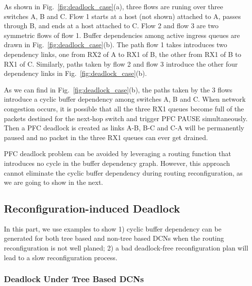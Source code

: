 As shown in Fig.~\ref{fig:deadlock_case}(a), three flows are runing over three switches A, B and C. Flow 1 starts at a host (not shown) attached to A, passes through B, and ends at a host attached to C. Flow 2 and flow 3 are two symmetric flows of flow 1. Buffer dependencies among active ingress queues are drawn in Fig.~\ref{fig:deadlock_case}(b). The path flow 1 takes introduces two dependency links, one from RX2 of A to RX1 of B, the other from RX1 of B to RX1 of C. Similarly, paths taken by flow 2 and flow 3 introduce the other four dependency links in Fig.~\ref{fig:deadlock_case}(b).

As we can find in Fig.~\ref{fig:deadlock_case}(b), the paths taken by the 3 flows introduce a cyclic buffer dependency among switches A, B and C. When network congestion occurs, it is possible that all the three RX1 queues become full of the packets destined for the next-hop switch and trigger PFC PAUSE simultaneously. Then a PFC deadlock is created as links A-B, B-C and C-A will be permanently paused and no packet in the three RX1 queues can ever get drained.

PFC deadlock problem can be avoided by leveraging a routing function that introduces no cycle in the buffer dependency graph. However, this approach cannot eliminate the cyclic buffer dependency during routing reconfiguration, as we are going to show in the next.

\subsection{Reconfiguration-induced Deadlock}\label{subsec:reconfigdeadlock}

In this part, we use examples to show 1) cyclic buffer dependency can be generated for both tree based and non-tree based DCNs when the routing reconfiguration is not well planed; 2) a bad deadlock-free reconfiguration plan will lead to a slow reconfiguration process.

\subsubsection{Deadlock Under Tree Based DCNs}\label{subsubsec:treecase}

